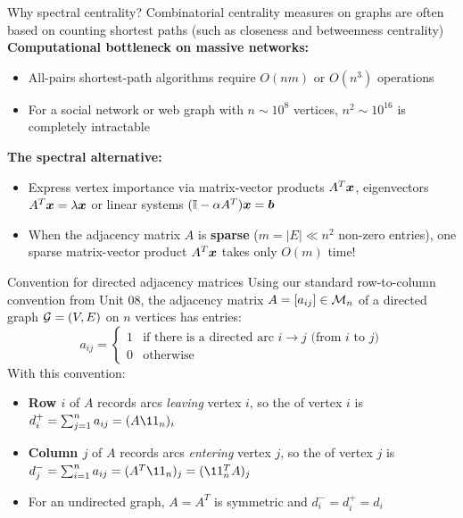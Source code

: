 \documentclass[aspectratio=169]{beamer}\usepackage[]{graphicx}\usepackage[]{xcolor}
\begin{document}


\begin{frame}{Why spectral centrality?}
Combinatorial centrality measures on graphs are often based on counting shortest paths (such as closeness and betweenness centrality)
\vfill
\textbf{Computational bottleneck on massive networks:}
\begin{itemize}
\item All-pairs shortest-path algorithms require $O(n m)$ or $O(n^3)$ operations
\item For a social network or web graph with $n \sim 10^8$ vertices, $n^2 \sim 10^{16}$ is completely intractable
\end{itemize}
\vfill
\textbf{The spectral alternative:}
\begin{itemize}
\item Express vertex importance via matrix-vector products $A^T\bm{x}$, eigenvectors $A^T\bm{x} = \lambda\bm{x}$ or linear systems $(\mathbb{I} - \alpha A^T)\bm{x} = \bm{b}$
\item When the adjacency matrix $A$ is \textbf{sparse} ($m = |E| \ll n^2$ non-zero entries), one sparse matrix-vector product $A^T\bm{x}$ takes only $O(m)$ time!
\end{itemize}
\end{frame}

\begin{frame}{Convention for directed adjacency matrices}
Using our standard row-to-column convention from Unit 08, the adjacency matrix $A = [a_{ij}] \in \mathcal{M}_n$ of a directed graph $\mathcal{G} = (V, E)$ on $n$ vertices has entries:
\vfill
\[
a_{ij} = \begin{cases}
1 & \text{if there is a directed arc } i \to j \text{ (from } i \text{ to } j\text{)} \\
0 & \text{otherwise}
\end{cases}
\]
\vfill
With this convention:
\begin{itemize}
\item \textbf{Row $i$} of $A$ records arcs \emph{leaving} vertex $i$, so the  of vertex $i$ is $d_i^+ = \sum_{j=1}^n a_{ij} = (A\11_n)_i$
\item \textbf{Column $j$} of $A$ records arcs \emph{entering} vertex $j$, so the  of vertex $j$ is $d_j^- = \sum_{i=1}^n a_{ij} = (A^T\11_n)_j = (\11_n^T A)_j$
\item For an undirected graph, $A = A^T$ is symmetric and $d_i^- = d_i^+ = d_i$
\end{itemize}
\end{frame}
\end{document}
